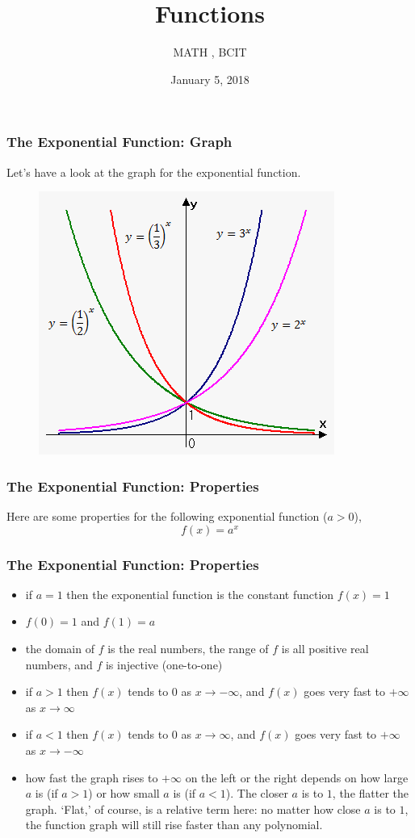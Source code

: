\documentclass[xcolor=dvipsnames]{beamer}
\title{Functions}
\subtitle{MATH {\CourseNumber}, BCIT}
\author{\CourseName}
\date{January 5, 2018}
\begin{document}
\begin{frame}
  \titlepage
\end{frame}

\begin{frame}
  \frametitle{The Exponential Function: Graph}
Let's have a look at the graph for the exponential function.
  \begin{figure}[h]
    \includegraphics[scale=.6]{./1_2_exponential_function.png}
  \end{figure}
\end{frame}

\begin{frame}
  \frametitle{The Exponential Function: Properties}
  Here are some properties for the following exponential function
  ($a>0$),
\begin{equation}
  \label{eq:muwauzie}
  f(x)=a^{x}
\end{equation}
\end{frame}

\begin{frame}
  \frametitle{The Exponential Function: Properties}
\begin{itemize}
\item<1-> if $a=1$ then the exponential function is the constant function $f(x)=1$
\item<2-> $f(0)=1$ and $f(1)=a$
\item<3-> the domain of $f$ is the real numbers, the range of $f$ is
  all positive real numbers, and $f$ is injective (one-to-one)
\item<4-> if $a>1$ then $f(x)$ tends to $0$ as $x\rightarrow -\infty$, and
  $f(x)$ goes very fast to $+\infty$ as $x\rightarrow \infty$
\item<5-> if $a<1$ then $f(x)$ tends to $0$ as $x\rightarrow \infty$, and
  $f(x)$ goes very fast to $+\infty$ as $x\rightarrow -\infty$
\item<6-> how fast the graph rises to $+\infty$ on the left or the
  right depends on how large $a$ is (if $a>1$) or how small
  $a$ is (if $a<1$). The closer $a$ is to $1$, the flatter the graph.
  `Flat,' of course, is a relative term here: no matter how close $a$
  is to $1$, the function graph will still rise faster than any polynomial.
\end{itemize}
\end{frame}
\end{document}
